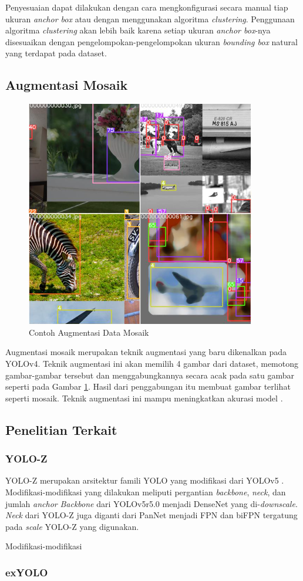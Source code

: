   Penyesuaian dapat dilakukan dengan cara mengkonfigurasi secara manual tiap ukuran \emph{anchor box} atau dengan menggunakan algoritma \emph{clustering}.
  Penggunaan algoritma \emph{clustering} akan lebih baik karena setiap ukuran \emph{anchor box}-nya disesuaikan dengan pengelompokan-pengelompokan ukuran \emph{bounding box} natural yang terdapat pada dataset.

\subsection{Augmentasi Mosaik}
  \begin{figure}[ht]
    \centering
    \includegraphics[scale=0.6]{pictures/mosaic-aug.png}
    \caption{Contoh Augmentasi Data Mosaik \parencite{yolov5}}
    \label{fig:mosaic}
  \end{figure}

  Augmentasi mosaik merupakan teknik augmentasi yang baru dikenalkan pada YOLOv4.
  Teknik augmentasi ini akan memilih 4 gambar dari dataset, memotong gambar-gambar tersebut dan menggabungkannya secara acak pada satu gambar seperti pada Gambar \ref{fig:mosaic}.
  Hasil dari penggabungan itu membuat gambar terlihat seperti mosaik.
  Teknik augmentasi ini mampu meningkatkan akurasi model \parencite{yolov4}.


\subsection{Penelitian Terkait}
  \subsubsection{YOLO-Z}
    YOLO-Z merupakan arsitektur famili YOLO yang modifikasi dari YOLOv5 \parencite{yoloz}.
    Modifikasi-modifikasi yang dilakukan meliputi pergantian \emph{backbone}, \emph{neck}, dan jumlah \emph{anchor}
    \emph{Backbone} dari YOLOv5r5.0 menjadi DenseNet yang di-\emph{downscale}.
    \emph{Neck} dari YOLO-Z juga diganti dari PanNet menjadi FPN dan biFPN tergatung pada \emph{scale} YOLO-Z yang digunakan.

    Modifikasi-modifikasi
    \lipsum[2]
  \subsubsection{exYOLO}
    \lipsum[2]